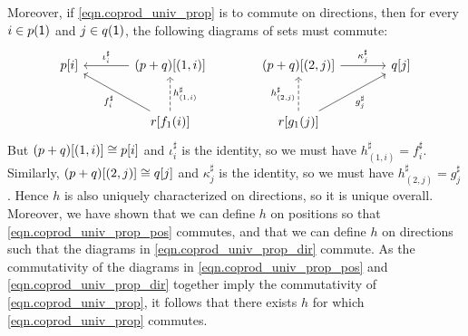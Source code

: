 \documentclass[Book-Poly]{subfiles}
\begin{document}
\begin{exercise}
\begin{solution}
Moreover, if \eqref{eqn.coprod_univ_prop} is to commute on directions, then for every $i \in p(\textsf{1})$ and $j \in q(\textsf{1})$, the following diagrams of sets must commute:
\begin{equation} \label{eqn.coprod_univ_prop_dir}
\begin{tikzcd}[sep=large]
	p[i] & (p+q)[(1,i)] \ar[l, "\iota^\sharp_i"'] & (p+q)[(2,j)] \ar[r, "\kappa^\sharp_j"] & q[j] \\
	& r[f_1(i)] \ar[ul, "f^\sharp_i"] \ar[u, "h^\sharp_{(1,i)}"', dashed] & r[g_1(j)] \ar[u, "h^\sharp_{(2,j)}", dashed] \ar[ur, "g^\sharp_j"']
\end{tikzcd}
\end{equation}
But $(p+q)[(1,i)] \cong p[i]$ and $\iota^\sharp_i$ is the identity, so we must have $h^\sharp_{(1,i)} = f^\sharp_i$.
Similarly, $(p+q)[(2,j)] \cong q[j]$ and $\kappa^\sharp_j$ is the identity, so we must have $h^\sharp_{(2,j)} = g^\sharp_j$.
Hence $h$ is also uniquely characterized on directions, so it is unique overall.
Moreover, we have shown that we can define $h$ on positions so that \eqref{eqn.coprod_univ_prop_pos} commutes, and that we can define $h$ on directions such that the diagrams in \eqref{eqn.coprod_univ_prop_dir} commute.
As the commutativity of the diagrams in \eqref{eqn.coprod_univ_prop_pos} and \eqref{eqn.coprod_univ_prop_dir} together imply the commutativity of \eqref{eqn.coprod_univ_prop}, it follows that there exists $h$ for which \eqref{eqn.coprod_univ_prop} commutes.
\end{solution}
\end{exercise}

\end{document}
